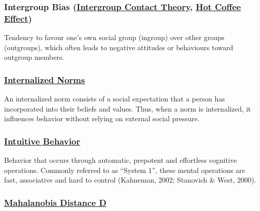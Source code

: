 \documentclass[
  letterpaper,
]{book}
\begin{document}
\subsubsection*{\texorpdfstring{Intergroup Bias
(\hyperref[def-intergroupbias]{Intergroup Contact Theory},
\hyperref[def-intergroupbias]{Hot Coffee
Effect})}{Intergroup Bias (Intergroup Contact Theory, Hot Coffee Effect)}}\label{intergroup-bias-intergroup-contact-theory-hot-coffee-effect}

Tendency to favour one's own social group (ingroup) over other groups
(outgroups), which often leads to negative attitudes or behaviours
toward outgroup members.

\subsubsection*{\texorpdfstring{\hyperref[def-internalnorms]{Internalized
Norms}}{Internalized Norms}}\label{internalized-norms}

An internalized norm consists of a social expectation that a person has
incorporated into their beliefs and values. Thus, when a norm is
internalized, it influences behavior without relying on external social
pressure.

\subsubsection*{\texorpdfstring{\hyperref[def-intuitivebehavior]{Intuitive
Behavior}}{Intuitive Behavior}}\label{intuitive-behavior}

Behavior that occurs through automatic, prepotent and effortless
cognitive operations. Commonly referred to as ``System 1'', these mental
operations are fast, associative and hard to control (Kahneman, 2002;
Stanovich \& West, 2000).

\subsubsection*{\texorpdfstring{\hyperref[def-mahalanobisdistanced]{Mahalanobis
Distance D}}{Mahalanobis Distance D}}\label{mahalanobis-distance-d}
\end{document}
